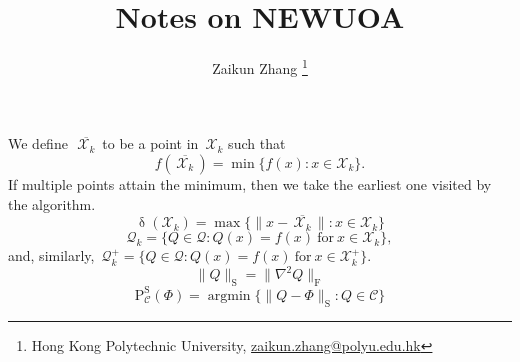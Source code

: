 \documentclass[11pt,a4paper,draft]{article}  %
\title{Notes on NEWUOA}
\date{\DTMnow}
\author{Zaikun Zhang
    \thanks{Hong Kong Polytechnic University, \url{zaikun.zhang@polyu.edu.hk}}
}
\theoremstyle{definition}
\numberwithin{equation}{section}
\newcommand{\mbar}[1]{\,\overline{\!{#1}\!}\,} %
\newcommand{\xopt}{\mbar}
\DeclareMathOperator{\xdist}{\updelta}
\DeclareMathOperator*{\argmin}{argmin}
\newcommand{\Int}{\mathcal{X}}
\newcommand{\Qua}{\mathcal{Q}}
\newcommand{\sss}[1]{{\scriptscriptstyle{#1}}}
\newcommand{\new}{{\sss{+}}}
\newcommand{\fro}{{\scriptscriptstyle{\textrm{F}}}}
\newcommand{\sob}{{\scriptscriptstyle{\textrm{S}}}}
\newcommand{\Projs}{\mathrm{P}^\sob}
\begin{document}
\maketitle



We define~$\xopt{\Int_k}$ to be a point in~$\Int_k$ such that
\begin{equation}
    \label{eq:xopt}
    f(\xopt{\Int_k}) = \min\{f(x) \mathrel{:} x\in \Int_k\}.
\end{equation}
If multiple points attain the minimum, then we take the earliest one visited by the algorithm.
\begin{equation}
    \label{eq:xdist}
    \xdist(\Int_k) = \max\{\|x-\xopt{\Int_k}\| \mathrel{:} x\in \Int_k\}
\end{equation}
\begin{equation}
    \label{eq:quak}
    \Qua_k = \{Q\in\Qua \mathrel{:} Q(x) = f(x)~\text{for}~x\in\Int_k\},
\end{equation}
and, similarly,~$\Qua_k^\new = \{Q\in\Qua \mathrel{:} Q(x) = f(x)~\text{for}~x\in\Int_k^\new\}$.
\begin{equation}
    \label{eq:snorm}
    \|Q\|_\sob = \|\nabla^2 Q\|_\fro
\end{equation}
\begin{equation*}
    \Projs_{\mathcal{C}}(\Phi) = \argmin\{\|Q-\Phi\|_\sob \mathrel{:} Q\in\mathcal{C}\}
\end{equation*}
\end{document}
